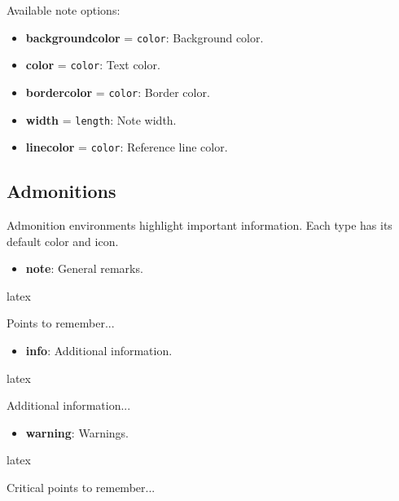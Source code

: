 \documentclass[
    margin=2cm
]{neoschool}
\begin{document}
Available note options:

\begin{itemize}
\item
  \textbf{backgroundcolor} = \texttt{color}: Background
  color.
\item
  \textbf{color} = \texttt{color}: Text color.
\item
  \textbf{bordercolor} = \texttt{color}: Border color.
\item
  \textbf{width} = \texttt{length}: Note width.
\item
  \textbf{linecolor} = \texttt{color}: Reference line
  color.
\end{itemize}

\subsection{Admonitions}

Admonition environments highlight important information. Each type has
its default color and icon.

\begin{itemize}
\item
  \textbf{note}: General remarks.
\end{itemize}

\begin{code}{latex}
\begin{note}
    Points to remember...
\end{note}
\end{code}

\begin{itemize}
\item
  \textbf{info}: Additional information.
\end{itemize}

\begin{code}{latex}
\begin{info}
    Additional information...
\end{info}
\end{code}

\begin{itemize}
\item
  \textbf{warning}: Warnings.
\end{itemize}

\begin{code}{latex}
\begin{warning}[Caution!][\faExclamationTriangle]
    Critical points to remember...
\end{warning}
\end{code}
\end{document}
